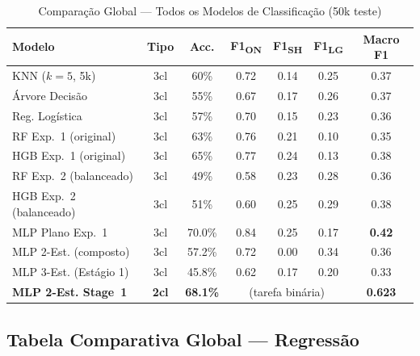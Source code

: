 \documentclass[conference]{IEEEtran}
\begin{document}
\begin{table}[h]
\centering
\caption{Comparação Global — Todos os Modelos de Classificação (50k teste)}
\label{tab:global}
\setlength{\tabcolsep}{2pt}
\begin{tabular}{p{2.4cm}cccccc}
\toprule
\textbf{Modelo} & \textbf{Tipo} & \textbf{Acc.} & \textbf{F1\textsubscript{ON}} & \textbf{F1\textsubscript{SH}} & \textbf{F1\textsubscript{LG}} & \textbf{Macro F1} \\
\midrule
KNN ($k=5$, 5k)         & 3cl & 60\%   & 0.72 & 0.14 & 0.25 & 0.37 \\
Árvore Decisão           & 3cl & 55\%   & 0.67 & 0.17 & 0.26 & 0.37 \\
Reg. Logística           & 3cl & 57\%   & 0.70 & 0.15 & 0.23 & 0.36 \\
RF Exp.~1 (original)    & 3cl & 63\%   & 0.76 & 0.21 & 0.10 & 0.35 \\
HGB Exp.~1 (original)   & 3cl & 65\%   & 0.77 & 0.24 & 0.13 & 0.38 \\
RF Exp.~2 (balanceado)  & 3cl & 49\%   & 0.58 & 0.23 & 0.28 & 0.36 \\
HGB Exp.~2 (balanceado) & 3cl & 51\%   & 0.60 & 0.25 & 0.29 & 0.38 \\
MLP Plano Exp.~1         & 3cl & 70.0\% & 0.84 & 0.25 & 0.17 & \textbf{0.42} \\
MLP 2-Est. (composto)   & 3cl & 57.2\% & 0.72 & 0.00 & 0.34 & 0.36 \\
MLP 3-Est. (Estágio 1)  & 3cl & 45.8\% & 0.62 & 0.17 & 0.20 & 0.33 \\
\midrule
\textbf{MLP 2-Est. Stage~1} & \textbf{2cl} & \textbf{68.1\%} & \multicolumn{3}{c}{(tarefa binária)} & \textbf{0.623} \\
\bottomrule
\end{tabular}
\end{table}

\subsection{Tabela Comparativa Global — Regressão}
\end{document}
